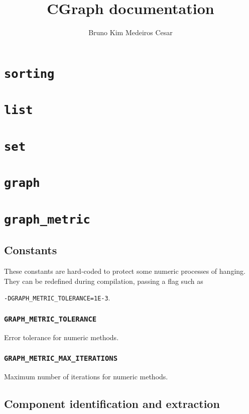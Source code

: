 \documentclass[a4paper,10pt]{article}
\title{CGraph documentation}
\author{Bruno Kim Medeiros Cesar}
\begin{document}
\maketitle


\begin{abstract}
\end{abstract}

\section{\texttt{sorting}}
\section{\texttt{list}}
\section{\texttt{set}}
\section{\texttt{graph}}
\section{\texttt{graph\_metric}}

\subsection{Constants}

These constants are hard-coded to protect some numeric processes of hanging.
They can be redefined during compilation, passing a flag such as 

\texttt{-DGRAPH\_METRIC\_TOLERANCE=1E-3}.

\subsubsection{\texttt{GRAPH\_METRIC\_TOLERANCE}}

Error tolerance for numeric methods.

\subsubsection{\texttt{GRAPH\_METRIC\_MAX\_ITERATIONS}}

Maximum number of iterations for numeric methods.

\subsection{Component identification and extraction}
\end{document}
